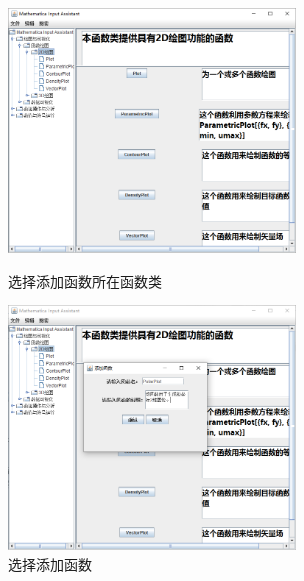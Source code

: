 \documentclass[hyperref, UTF8
,bookmarksnumbered=true, oneside]{ctexbook}
\begin{document}
	\bigskip
	\bigskip
	\bigskip
	\begin{figure}[!h]
	                \begin{minipage}[b]{0.45\textwidth}
	                \centering
	                \includegraphics[width=3in]{10.png}
	                \caption{选择添加函数所在函数类}
	                \label{pic:MathPack}
	                \end{minipage}%
	                \hspace{0.1\textwidth}%
	                \begin{minipage}[b]{0.45\textwidth}
	                \centering
	                \includegraphics[width=3in]{11.png}
	                \caption{选择添加函数}
	                \label{pic:GUIPack}
	                \end{minipage}
            	\end{figure}
\end{document}
